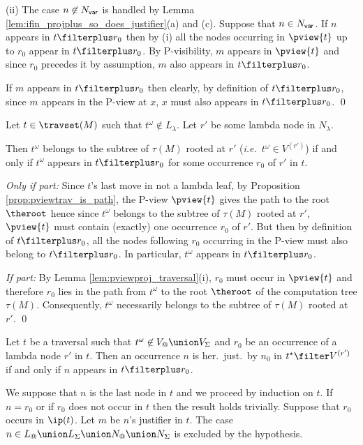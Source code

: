 (ii) The case $n\not\in  N_{\sf var}$ is handled by Lemma
\ref{lem:ifin_projplus_so_does_justifier}(a) and (c). Suppose that
$n\in  N_{\sf var}$. If $n$ appears in $t\filterplus r_0$ then by
(i) all the nodes occurring in $\pview{t}$ up to $r_0$ appear in
$t\filterplus r_0$. By P-visibility, $m$ appears in $\pview{t}$ and
since $r_0$ precedes it by assumption, $m$ also appears in
$t\filterplus r_0$.

If $m$ appears in $t\filterplus r_0$ then clearly, by definition of
$t\filterplus r_0$, since $m$ appears in the P-view at $x$, $x$ must
also appears in $t\filterplus r_0$. \qed


\begin{lemma}
\label{lem:insubterm_equ_inprojplus}
   Let $t \in \travset(M)$ such that $t^\omega \not\in L_\lambda$. Let $r'$ be some lambda node in $N_\lambda$. 
   
   Then $t^\omega$ belongs to the subtree of $\tau(M)$ rooted at $r'$ ({\it i.e.}\ $t^\omega \in V^{(r')}$) if and only if
   $t^\omega$ appears in $t\filterplus r_0$ for some occurrence $r_0$ of $r'$ in $t$.
\end{lemma}

\proof 
\emph{Only if part:} Since $t$'s last move in not a lambda leaf, by
Proposition \ref{prop:pviewtrav_is_path}, the P-view $\pview{t}$
gives the path to the root $\theroot$ hence since $t^\omega$ belongs
to the subtree of $\tau(M)$ rooted at $r'$, $\pview{t}$ must contain
(exactly) one occurrence $r_0$ of $r'$. But then by definition of $t\filterplus r_0$, all the nodes following $r_0$
occurring in the P-view must also belong to $t\filterplus r_0$. In particular, $t^\omega$ appears in $t\filterplus r_0$.

\emph{If part:} By Lemma \ref{lem:pviewproj_traversal}(i), $r_0$ must occur in $\pview{t}$
and therefore $r_0$ lies in the path from $t^\omega$ to the root $\theroot$ of the computation
tree $\tau(M)$. Consequently, $t^\omega$ necessarily belongs to the subtree of $\tau(M)$ rooted at $r'$.
\qed
\smallskip

\begin{lemma}
\label{lem:intfilterstar_iff_hjintstarfiltersubtree}
 Let $t$ be a traversal such that $t^\omega \not\in V_@ \union V_\Sigma$
and $r_0$ be an occurrence of a lambda node $r'$ in $t$. Then an
occurrence $n$ is her.\ just.\ by $n_0$ in $t^\star\filter V^{(r')}$
if and only if $n$ appears in $t\filterplus r_0$.
\end{lemma}
\proof We suppose that $n$ is the last node in $t$ and we proceed by
induction on $t$. If $n=r_0$ or if $r_0$ does not occur in $t$ then
the result holds trivially. Suppose that $r_0$ occurs in $\ip(t)$.
Let $m$ be $n$'s justifier in $t$. The case $n\in L_@ \union
L_\Sigma \union N_@ \union N_\Sigma$ is excluded by the hypothesis.

